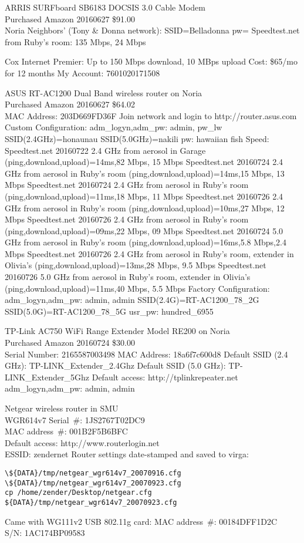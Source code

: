 \documentclass[12pt,twoside]{article}
\begin{document}
ARRIS SURFboard SB6183 DOCSIS 3.0 Cable Modem\\
Purchased Amazon 20160627 \$91.00\\

Noria Neighbors' (Tony \& Donna network):
SSID=Belladonna
pw=
Speedtest.net from Ruby's room: 135 Mbps, 24 Mbps

Cox Internet Premier: Up to 150 Mbps download, 10 MBps upload Cost: \$65/mo for 12 months
My Account: 7601020171508 

ASUS RT-AC1200 Dual Band wireless router on Noria\\
Purchased Amazon 20160627 \$64.02\\
MAC Address: 203D669FD36F
Join network and login to http://router.asus.com
Custom Configuration:
adm_logyn,adm_pw: admin, pw_lw
SSID(2.4GHz)=honaunau
SSID(5.0GHz)=nakili
pw: hawaiian fish
Speed:
Speedtest.net 20160722 2.4 GHz from aerosol in Garage (ping,download,upload)=14ms,82 Mbps, 15 Mbps
Speedtest.net 20160724 2.4 GHz from aerosol in Ruby's room (ping,download,upload)=14ms,15 Mbps, 13 Mbps
Speedtest.net 20160724 2.4 GHz from aerosol in Ruby's room (ping,download,upload)=11ms,18 Mbps, 11 Mbps
Speedtest.net 20160726 2.4 GHz from aerosol in Ruby's room (ping,download,upload)=10ms,27 Mbps, 12 Mbps
Speedtest.net 20160726 2.4 GHz from aerosol in Ruby's room (ping,download,upload)=09ms,22 Mbps, 09 Mbps
Speedtest.net 20160724 5.0 GHz from aerosol in Ruby's room (ping,download,upload)=16ms,5.8 Mbps,2.4 Mbps
Speedtest.net 20160726 2.4 GHz from aerosol in Ruby's room, extender in Olivia's (ping,download,upload)=13ms,28 Mbps, 9.5 Mbps
Speedtest.net 20160726 5.0 GHz from aerosol in Ruby's room, extender in Olivia's (ping,download,upload)=11ms,40 Mbps, 5.5 Mbps
Factory Configuration:
adm_logyn,adm_pw: admin, admin
SSID(2.4G)=RT-AC1200_78_2G
SSID(5.0G)=RT-AC1200_78_5G
usr_pw: hundred_6955

TP-Link AC750 WiFi Range Extender Model RE200 on Noria\\
Purchased Amazon 20160724 \$30.00\\
Serial Number: 2165587003498
MAC Address: 18a6f7c600d8
Default SSID (2.4 GHz): TP-LINK_Extender_2.4Ghz
Default SSID (5.0 GHz): TP-LINK_Extender_5Ghz
Default access:
http://tplinkrepeater.net
adm_logyn,adm_pw: admin, admin

Netgear wireless router in SMU\\
WGR614v7
Serial~\#: 1JS2767T02DC9 \\
MAC address~\#: 001B2F5B6BFC \\
Default access: http://www.routerlogin.net \\
ESSID: zendernet
Router settings date-stamped and saved to virga: 
\begin{verbatim}
\${DATA}/tmp/netgear_wgr614v7_20070916.cfg
\${DATA}/tmp/netgear_wgr614v7_20070923.cfg
cp /home/zender/Desktop/netgear.cfg ${DATA}/tmp/netgear_wgr614v7_20070923.cfg
\end{verbatim}
Came with WG111v2 USB 802.11g card:
MAC address~\#: 00184DFF1D2C \\
S/N: 1AC174BP09583 \\
\end{document}
